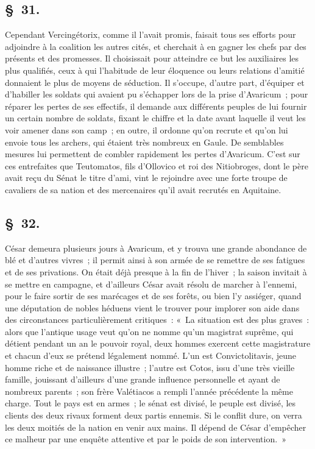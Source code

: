 \documentclass[french,twoside]{book} %
\begin{document}
\subsection[{§ 31.}]{ \textsc{§ 31.} }
\noindent Cependant Vercingétorix, comme il l’avait promis, faisait tous ses efforts pour adjoindre à la coalition les autres cités, et cherchait à en gagner les chefs par des présents et des promesses. Il choisissait pour atteindre ce but les auxiliaires les plus qualifiés, ceux à qui l’habitude de leur éloquence ou leurs relations d’amitié donnaient le plus de moyens de séduction. Il s’occupe, d’autre part, d’équiper et d’habiller les soldats qui avaient pu s’échapper lors de la prise d’Avaricum ; pour réparer les pertes de ses effectifs, il demande aux différents peuples de lui fournir un certain nombre de soldats, fixant le chiffre et la date avant laquelle il veut les voir amener dans son camp ; en outre, il ordonne qu’on recrute et qu’on lui envoie tous les archers, qui étaient très nombreux en Gaule. De semblables mesures lui permettent de combler rapidement les pertes d’Avaricum. C'est sur ces entrefaites que Teutomatos, fils d’Ollovico et roi des Nitiobroges, dont le père avait reçu du Sénat le titre d’ami, vint le rejoindre avec une forte troupe de cavaliers de sa nation et des mercenaires qu’il avait recrutés en Aquitaine.
\subsection[{§ 32.}]{ \textsc{§ 32.} }
\noindent César demeura plusieurs jours à Avaricum, et y trouva une grande abondance de blé et d’autres vivres ; il permit ainsi à son armée de se remettre de ses fatigues et de ses privations. On était déjà presque à la fin de l’hiver ; la saison invitait à se mettre en campagne, et d’ailleurs César avait résolu de marcher à l’ennemi, pour le faire sortir de ses marécages et de ses forêts, ou bien l’y assiéger, quand une députation de nobles héduens vient le trouver pour implorer son aide dans des circonstances particulièrement critiques : « La situation est des plus graves : alors que l’antique usage veut qu’on ne nomme qu’un magistrat suprême, qui détient pendant un an le pouvoir royal, deux hommes exercent cette magistrature et chacun d’eux se prétend légalement nommé. L'un est Convictolitavis, jeune homme riche et de naissance illustre ; l’autre est Cotos, issu d’une très vieille famille, jouissant d’ailleurs d’une grande influence personnelle et ayant de nombreux parents ; son frère Valétiacos a rempli l’année précédente la même charge. Tout le pays est en armes ; le sénat est divisé, le peuple est divisé, les clients des deux rivaux forment deux partis ennemis. Si le conflit dure, on verra les deux moitiés de la nation en venir aux mains. Il dépend de César d’empêcher ce malheur par une enquête attentive et par le poids de son intervention. »
\end{document}
